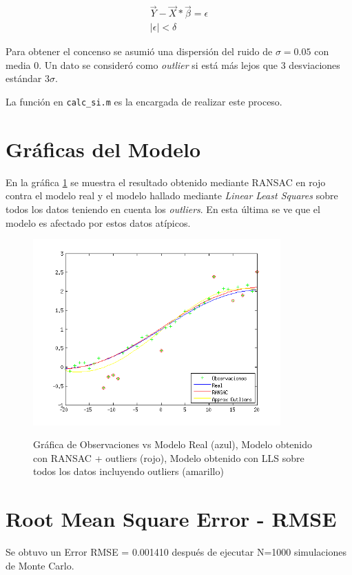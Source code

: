 \documentclass{IEEEtran}
\begin{document}
\begin{equation*}
\begin{aligned}
\vec{Y} - \vec{X}*\vec{\beta} = \epsilon \\
|\epsilon| < \delta
\end{aligned}
\end{equation*} 

Para obtener el concenso se asumió una dispersión del ruido
de $\sigma = 0.05$ con media 0. 
Un dato se consideró como \textit{outlier} si
está más lejos que 3 desviaciones estándar $3\sigma$.

La función en \verb+calc_si.m+ es la encargada de realizar
este proceso.

\section{Gráficas del Modelo}

En la gráfica \ref{fig:outliers} se muestra el resultado
obtenido mediante RANSAC en rojo contra el modelo real
y el modelo hallado mediante \textit{Linear Least Squares}
sobre todos los datos teniendo en cuenta los
\textit{outliers}. En esta última se ve que el modelo
es afectado por estos datos atípicos.

\begin{figure}[H]
\caption{Gráfica de Observaciones vs Modelo Real (azul), Modelo
obtenido con RANSAC + outliers (rojo), Modelo obtenido con LLS
sobre todos los datos incluyendo outliers (amarillo)}
\centering
\includegraphics[width=9.5cm,natwidth=560,natheight=420]{figs/outliers.png}
\label{fig:outliers}
\end{figure}

\section{Root Mean Square Error - RMSE}
Se obtuvo un Error RMSE = 0.001410 después
de ejecutar N=1000 simulaciones de Monte Carlo.
\end{document}
